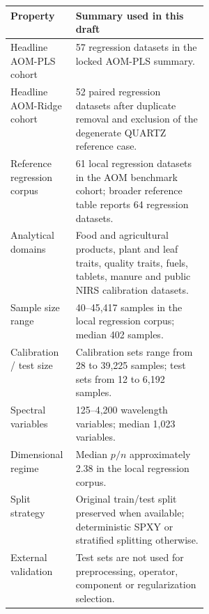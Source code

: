 \begin{tabularx}{\linewidth}{p{0.33\linewidth}X}
\toprule
Property & Summary used in this draft \\
\midrule
Headline AOM-PLS cohort & 57 regression datasets in the locked AOM-PLS summary. \\
Headline AOM-Ridge cohort & 52 paired regression datasets after duplicate removal and exclusion of the degenerate QUARTZ reference case. \\
Reference regression corpus & 61 local regression datasets in the AOM benchmark cohort; broader reference table reports 64 regression datasets. \\
Analytical domains & Food and agricultural products, plant and leaf traits, quality traits, fuels, tablets, manure and public NIRS calibration datasets. \\
Sample size range & 40--45,417 samples in the local regression corpus; median 402 samples. \\
Calibration / test size & Calibration sets range from 28 to 39,225 samples; test sets from 12 to 6,192 samples. \\
Spectral variables & 125--4,200 wavelength variables; median 1,023 variables. \\
Dimensional regime & Median $p/n$ approximately 2.38 in the local regression corpus. \\
Split strategy & Original train/test split preserved when available; deterministic SPXY or stratified splitting otherwise. \\
External validation & Test sets are not used for preprocessing, operator, component or regularization selection. \\
\bottomrule
\end{tabularx}
